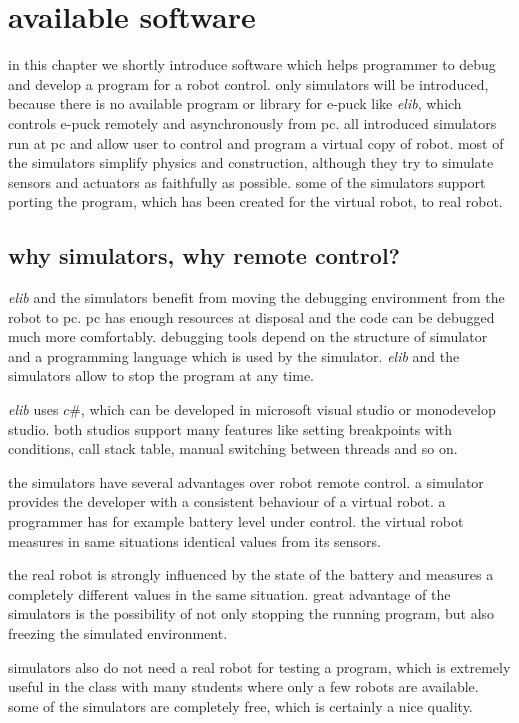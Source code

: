 \chapter{available software} \label{chap:software}
  in this chapter we shortly introduce software which helps programmer
  to debug and develop a program for a robot control. only simulators will be introduced, because 
  there is no available program or library for e-puck like {\it elib},
  which controls e-puck remotely and asynchronously from pc.
  all introduced simulators run at pc and allow user to control and program a virtual copy of robot.
  most of the simulators simplify physics and construction, although they try to simulate sensors
  and actuators as faithfully as possible. some of the simulators support porting the program,
  which has been created for the virtual robot, to real robot.
  
\section{why simulators, why remote control?}
  {\it elib} and the simulators benefit from moving the debugging environment from the robot to pc.
  pc has enough resources at disposal and the code can be debugged much more comfortably. debugging
  tools depend on the structure of simulator and a programming language which is used by the simulator.
  {\it elib} and the simulators allow to stop the program at any time.
  
  {\it elib} uses $c\#$, which can be developed in microsoft visual studio or monodevelop studio.
  both studios support many features like setting breakpoints with conditions, call stack table,
  manual switching between threads and so on.
  
  the simulators have several advantages over robot remote control.
  a simulator provides the developer with a consistent behaviour of a virtual robot.
  a programmer has for example battery level under control. 
  the virtual robot measures in same situations identical values from its sensors. 
  
  the real robot is strongly influenced by the state of the battery
  and measures a completely different values in the same situation.
  great advantage of the simulators is the possibility of not only stopping
  the running program, but also freezing the simulated environment. 
  
  simulators also do not need a real robot for testing a program, which is extremely
  useful in the class with many students where only a few robots are available.
  some of the simulators are completely free, which is certainly a nice quality.
  
